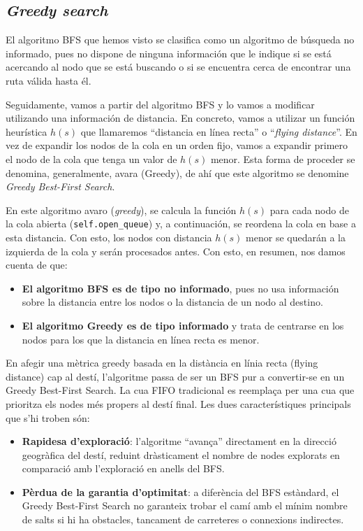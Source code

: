 \documentclass{article}
\begin{document}
\subsection{\textit{Greedy search}}
El algoritmo BFS que hemos visto se clasifica como un algoritmo de búsqueda no informado, pues no dispone de ninguna información que le indique si se está acercando al nodo que se está buscando o si se encuentra cerca de encontrar una ruta válida hasta él.

Seguidamente, vamos a partir del algoritmo BFS y lo vamos a modificar utilizando una información de distancia. En concreto, vamos a utilizar un función heurística $h(s)$ que llamaremos ``distancia en línea recta'' o ``\textit{flying distance}''. En vez de expandir los nodos de la cola en un orden fijo, vamos a expandir primero el nodo de la cola que tenga un valor de $h(s)$ menor. Esta forma de proceder se denomina, generalmente, avara (Greedy), de ahí que este algoritmo se denomine \textit{Greedy Best-First Search}.

En este algoritmo avaro (\textit{greedy}), se calcula la función $h(s)$ para cada nodo de la cola abierta (\texttt{self.open\_queue}) y, a continuación, se reordena la cola en base a esta distancia. Con esto, los nodos con distancia $h(s)$ menor se quedarán a la izquierda de la cola y serán procesados antes. Con esto, en resumen, nos damos cuenta de que:
\begin{itemize}
    \item \textbf{El algoritmo BFS es de tipo no informado}, pues no usa información sobre la distancia entre los nodos o la distancia de un nodo al destino.
    \item \textbf{El algoritmo Greedy es de tipo informado} y trata de centrarse en los nodos para los que la distancia en línea recta es menor. 
\end{itemize}

En afegir una mètrica greedy basada en la distància en línia recta (flying distance) cap al destí, l'algoritme passa de ser un BFS pur a convertir-se en un Greedy Best-First Search. La cua FIFO tradicional es reemplaça per una cua que prioritza els nodes més propers al destí final. Les dues característiques principals que s'hi troben són:
\begin{itemize}
    \item \textbf{Rapidesa d'exploració}: l'algoritme ``avança'' directament en la direcció geogràfica del destí, reduint dràsticament el nombre de nodes explorats en comparació amb l'exploració en anells del BFS.

    \item \textbf{Pèrdua de la garantia d'optimitat}: a diferència del BFS estàndard, el Greedy Best-First Search no garanteix trobar el camí amb el mínim nombre de salts si hi ha obstacles, tancament de carreteres o connexions indirectes.
\end{itemize}
\end{document}
